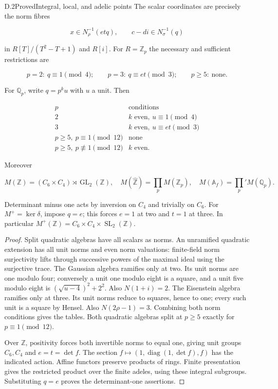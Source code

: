 \begin{statement}{D.2}{Proved}{Integral, local, and adelic points}
The scalar coordinates are precisely the norm fibres

$$
x\in N_\rho^{-1}(etq),\qquad c-di\in N_\sigma^{-1}(q)
$$

in $R[T]/(T^2-T+1)$ and $R[i]$.
For $R=\mathbb Z_p$ the necessary and sufficient restrictions are

$$
p=2:\ q\equiv1\pmod4;\qquad
 p=3:\ q\equiv et\pmod3;\qquad p\ge5:\ \text{none}.
$$

For $\mathbb Q_p$, write $q=p^ku$ with $u$ a unit. Then

$$
\begin{array}{c|l}
p&\text{conditions}\\\hline
2&k\text{ even},\ u\equiv1\pmod4\\
3&k\text{ even},\ u\equiv et\pmod3\\
p\ge5,\ p\equiv1\pmod{12}&\text{none}\\
p\ge5,\ p\not\equiv1\pmod{12}&k\text{ even}.
\end{array}
$$

Moreover

$$
M(\mathbb Z)=(C_6\times C_4)\rtimes\operatorname{GL}_2(\mathbb Z),
 \quad M(\widehat{\mathbb Z})=\prod_pM(\mathbb Z_p),\quad
 M(\mathbb A_f)=\prod_p'M(\mathbb Q_p).
$$

Determinant minus one acts by inversion on $C_4$ and trivially
on $C_6$. For $M^+=\ker\delta$, impose $q=e$;
this forces $e=1$ at two and $t=1$ at three.
In particular $M^+(\mathbb Z)=C_6\times C_4\times\operatorname{SL}_2(\mathbb Z)$.
\end{statement}
\begin{proof}
Split quadratic algebras have all scalars as norms.
An unramified quadratic extension has all unit norms and even
norm valuations: finite-field norm surjectivity lifts through
successive powers of the maximal ideal using the surjective trace.
The Gaussian algebra ramifies only at two.
Its unit norms are one modulo four; conversely a unit one
modulo eight is a square, and a unit five modulo eight is
$(\sqrt{u-4})^2+2^2$. Also $N(1+i)=2$.
The Eisenstein algebra ramifies only at three.
Its unit norms reduce to squares, hence to one; every such
unit is a square by Hensel. Also $N(2\rho-1)=3$.
Combining both norm conditions gives the tables.
Both quadratic algebras split at $p\ge5$ exactly for
$p\equiv1\pmod{12}$.

Over $\mathbb Z$, positivity forces both invertible norms
to equal one, giving unit groups $C_6,C_4$ and $e=t=\det f$.
The section $f\mapsto(1,\operatorname{diag}(1,\det f),f)$
has the indicated action. Affine functors preserve products
of rings. Finite presentation gives the restricted product
over the finite adeles, using these integral subgroups.
Substituting $q=e$ proves the determinant-one assertions.
\end{proof}

